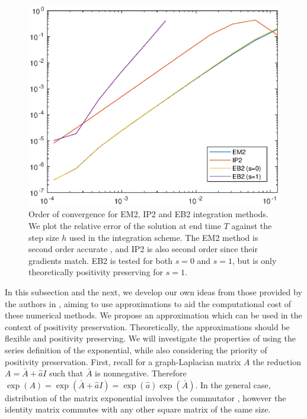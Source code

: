 \begin{figure}
    \centering
    \includegraphics[width=0.65\linewidth]{Matlab/magnusapproximations.eps}
    \caption{
        Order of convergence for EM2, IP2 and EB2 integration methods.
        We plot the relative error of the solution at end time $T$ against the step size $h$ used in the integration scheme.
        The EM2 method is second order accurate \cite{blanes_pos_2022},
        and IP2 is also second order since their gradients match.
        EB2 is tested for both $s=0$ and $s=1$, but is only theoretically positivity preserving for $s=1$.
    }
    \label{fig:magnusapprxorder}
\end{figure}

In this subsection and the next, we develop our own ideas from those provided by the authors in \cite{blanes_pos_2022},
aiming to use approximations to aid the computational cost of these numerical methods.
We propose an approximation which can be used in the context of positivity preservation.
Theoretically, the approximations should be flexible and positivity preserving.
We will investigate the properties of using the series definition of the exponential, while also considering the priority of positivity preservation.
First, recall for a graph-Laplacian matrix $A$ the reduction $A = \bar{A} + \hat{a}I$ such that $\bar{A}$ is nonnegative.
Therefore $\exp(A) = \exp(\bar{A} + \hat{a}I) = \exp(\hat{a})\exp(\bar{A})$.
In the general case, distribution of the matrix exponential involves the commutator \cite{higham2008exponential},
however the identity matrix commutes with any other square matrix of the same size.

